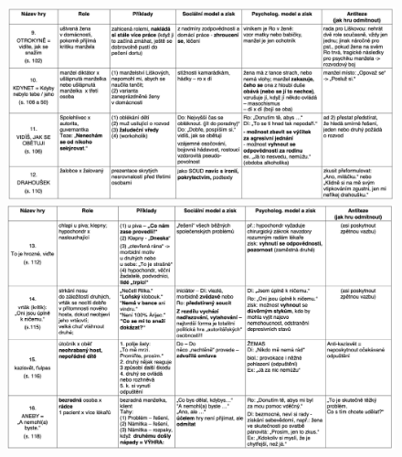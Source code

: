     \begin{figure}
        \centering
        \includegraphics[width=\textwidth]{pictures/4.png}
        \includegraphics[width=\textwidth]{pictures/5.png}
    \end{figure}{}
    

